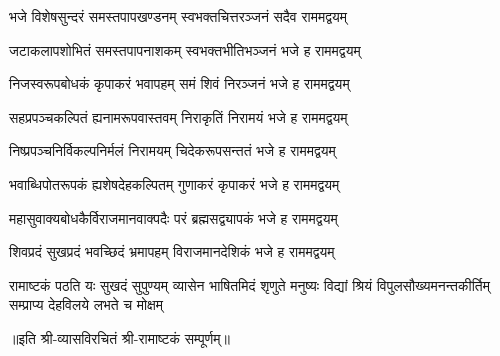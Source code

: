 
\twolineshloka
{भजे विशेषसुन्दरं समस्तपापखण्डनम्}
{स्वभक्तचित्तरञ्जनं सदैव राममद्वयम्}

\twolineshloka
{जटाकलापशोभितं समस्तपापनाशकम्}
{स्वभक्तभीतिभञ्जनं भजे ह राममद्वयम्}

\twolineshloka
{निजस्वरूपबोधकं कृपाकरं भवापहम्}
{समं शिवं निरञ्जनं भजे ह राममद्वयम्}

\twolineshloka
{सहप्रपञ्चकल्पितं ह्यनामरूपवास्तवम्}
{निराकृतिं निरामयं भजे ह राममद्वयम्}

\twolineshloka
{निष्प्रपञ्चनिर्विकल्पनिर्मलं निरामयम्}
{चिदेकरूपसन्ततं भजे ह राममद्वयम्}

\twolineshloka
{भवाब्धिपोतरूपकं ह्यशेषदेहकल्पितम्}
{गुणाकरं कृपाकरं भजे ह राममद्वयम्}

\twolineshloka
{महासुवाक्यबोधकैर्विराजमानवाक्पदैः}
{परं ब्रह्मसद्व्यापकं भजे ह राममद्वयम्}

\twolineshloka
{शिवप्रदं सुखप्रदं भवच्छिदं भ्रमापहम्}
{विराजमानदेशिकं भजे ह राममद्वयम्}

\fourlineindentedshloka
{रामाष्टकं पठति यः सुखदं सुपुण्यम्}
{व्यासेन भाषितमिदं शृणुते मनुष्यः}
{विद्यां श्रियं विपुलसौख्यमनन्तकीर्तिम्}
{सम्प्राप्य देहविलये लभते च मोक्षम्}
  
॥इति श्री-व्यासविरचितं श्री-रामाष्टकं सम्पूर्णम्॥